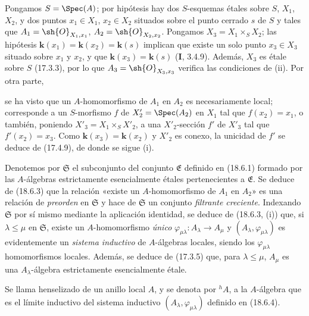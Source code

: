 Pongamos $S=\Spec(A)$; por hipótesis hay dos $S$-esquemas étales sobre $S$, $X_1$, $X_2$, y dos puntos $x_1\in X_1$, $x_2\in X_2$ situados sobre el punto cerrado $s$ de $S$ y tales que $A_1=\sh{O}_{X_1,x_1}$, $A_2=\sh{O}_{X_2,x_2}$. Pongamos $X_3=X_1\times_S X_2$; las hipótesis $\boldsymbol{k}(x_1)=\boldsymbol{k}(x_2)=\boldsymbol{k}(s)$ implican que existe un solo punto $x_3\in X_3$ situado sobre $x_1$ y $x_2$, y que $\boldsymbol{k}(x_3)=\boldsymbol{k}(s)$ (\textbf I, 3.4.9). Además, $X_3$ es étale sobre $S$ (17.3.3), por lo que $A_3=\sh{O}_{X_3,x_3}$ verifica las condiciones de (ii). Por otra parte,


se ha visto que un $A$-homomorfismo de $A_1$ en $A_2$ es necesariamente local; corresponde a un $S$-morfismo $f$ de $X'_2=\Spec(A_2)$ en $X_1$ tal que $f(x_2)=x_1$, o también, poniendo $X'_3=X_1\times_S X'_2$, a una $X'_2$-sección $f'$ de $X'_3$ tal que $f'(x_2)=x_3$. Como $\boldsymbol{k}(x_3)=\boldsymbol{k}(x_2)$ y $X'_2$ es conexo, la unicidad de $f'$ se deduce de (17.4.9), de donde se sigue (i).

\begin{env}[18.6.4]
\label{IV.18.6.4}
Denotemos por $\mathfrak S$ el subconjunto del conjunto $\mathfrak E$ definido en (18.6.1) formado por las $A$-álgebras estrictamente esencialmente étales pertenecientes a $\mathfrak E$. Se deduce de (18.6.3) que la relación «existe un $A$-homomorfismo de $A_1$ en $A_2$» es una relación de \emph{preorden} en $\mathfrak S$ y hace de $\mathfrak S$ un conjunto \emph{filtrante creciente}. Indexando $\mathfrak S$ por sí mismo mediante la aplicación identidad, se deduce de (18.6.3, (i)) que, si $\lambda\leq\mu$ en $\mathfrak S$, existe un $A$-homomorfismo \emph{único} $\varphi_{\mu\lambda}:A_\lambda\to A_\mu$ y $(A_\lambda,\varphi_{\mu\lambda})$ es evidentemente un \emph{sistema inductivo} de $A$-álgebras locales, siendo los $\varphi_{\mu\lambda}$ homomorfismos locales. Además, se deduce de (17.3.5) que, para $\lambda\leq\mu$, $A_\mu$ es una $A_\lambda$-álgebra estrictamente esencialmente étale.
\end{env}

\begin{definition}[18.6.5]
\label{IV.18.6.5}
Se llama henselizado de un anillo local $A$, y se denota por ${}^h\!A$, a la $A$-álgebra que es el límite inductivo del sistema inductivo $(A_\lambda,\varphi_{\mu\lambda})$ definido en \textup{(18.6.4)}.
\end{definition}

